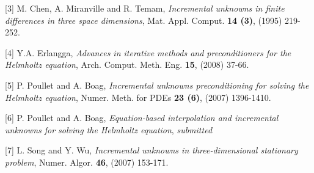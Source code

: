 \documentclass{report}
\begin{document}
[3] M. Chen, A. Miranville and R. Temam,
{\em Incremental unknowns in finite differences in three space dimensions},
Mat. Appl. Comput. {\bf 14 (3)}, (1995) 219-252.

[4] Y.A. Erlangga,
{\em Advances in iterative methods and preconditioners for the
Helmholtz equation},
Arch. Comput. Meth. Eng. {\bf 15}, (2008) 37-66.

[5] P. Poullet and A. Boag,
{\em Incremental unknowns preconditioning for solving the Helmholtz equation},
Numer. Meth. for PDEs {\bf 23 (6)}, (2007) 1396-1410.

[6] P. Poullet and A. Boag,
{\em Equation-based interpolation and incremental unknowns for solving
the Helmholtz equation}, {\it submitted}

[7] L. Song and Y. Wu,
{\em Incremental unknowns in three-dimensional stationary problem},
Numer. Algor. {\bf 46}, (2007) 153-171.
\end{document}
